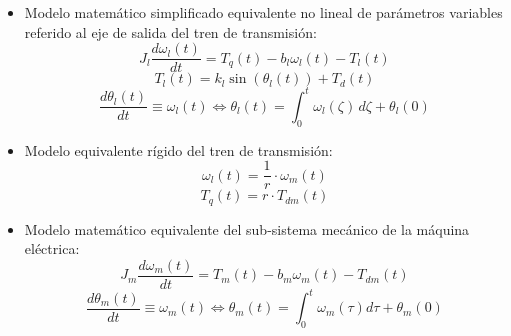 \documentclass[a4paper, 10pt, onecolumn,journal]{ieeeconf}
\begin{document}
\begin{itemize}
    \item Modelo matemático simplificado equivalente no lineal de parámetros variables referido al eje de salida del tren de transmisión:
    \begin{equation}
        J_l \frac{d\omega_l(t)}{dt} = T_q(t) - b_l \omega_l(t) - T_l(t)
        \label{carga mecanica}
    \end{equation}
    \begin{equation}
        T_l(t) = k_l \sin(\theta_l(t)) + T_d(t)
        \label{torque de carga}
    \end{equation}
    \begin{equation}
        \frac{d\theta_l(t)}{dt} \equiv \omega_l(t) \Leftrightarrow \theta_l(t) = \int_{0}^{t} \omega_l(\zeta) \, d\zeta + \theta_l(0)
        \label{velocidad y posición de la carga}
    \end{equation}

    \item Modelo equivalente rígido del tren de transmisión:
    \begin{equation}
        \omega_l(t) = \frac{1}{r} \cdot \omega_m(t)
        \label{relacion de velocidad en caja}
    \end{equation}
    \begin{equation}
        T_q(t) = r \cdot T_{dm}(t)
        \label{relacion de torque en caja}
    \end{equation}
    
    \item Modelo matemático equivalente del sub-sistema mecánico de la máquina eléctrica:
    \begin{equation}
        J_m \frac{d\omega_m(t)}{dt} = T_m(t) - b_m \omega_m(t) - T_{dm}(t)
        \label{subsistema mecanico maquina electrica}
    \end{equation}
    \begin{equation}
        \frac{d\theta_m(t)}{dt} \equiv \omega_m(t) \Leftrightarrow \theta_m(t) = \int_{0}^{t} \omega_m(\tau) d\tau + \theta_m(0)
        \label{posicion y velocidad motor}
    \end{equation}


\end{itemize}
\end{document}
